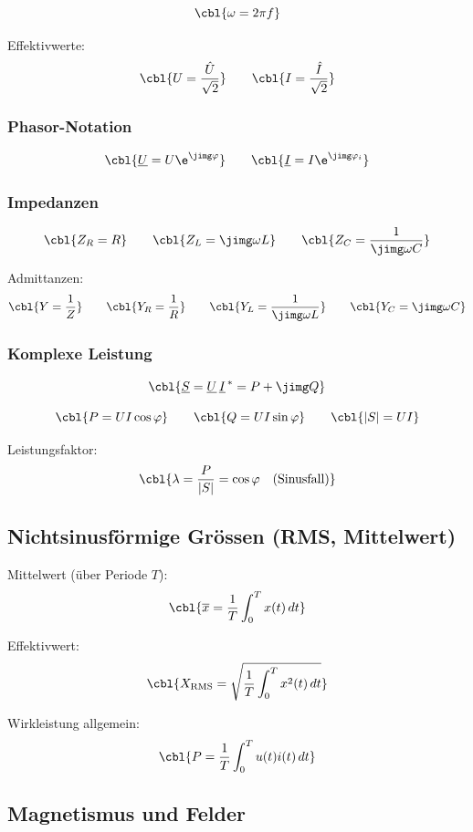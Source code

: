 \[
\cbl{\omega = 2\pi f}
\]

Effektivwerte:
\[
\cbl{U = \frac{\hat U}{\sqrt{2}}}
\qquad
\cbl{I = \frac{\hat I}{\sqrt{2}}}
\]

\subsubsection{Phasor-Notation}

\[
\cbl{\underline{U} = U \e^{\jimg \varphi}}
\qquad
\cbl{\underline{I} = I \e^{\jimg \varphi_i}}
\]

\subsubsection{Impedanzen}

\[
\cbl{Z_R = R}
\qquad
\cbl{Z_L = \jimg \omega L}
\qquad
\cbl{Z_C = \frac{1}{\jimg \omega C}}
\]

Admittanzen:
\[
\cbl{Y = \frac{1}{Z}}
\qquad
\cbl{Y_R = \frac{1}{R}}
\qquad
\cbl{Y_L = \frac{1}{\jimg \omega L}}
\qquad
\cbl{Y_C = \jimg \omega C}
\]

\subsubsection{Komplexe Leistung}

\[
\cbl{\underline{S} = \underline{U}\, \underline{I}^{\,\ast} = P + \jimg Q}
\]

\[
\cbl{P = U I \cos\varphi}
\qquad
\cbl{Q = U I \sin\varphi}
\qquad
\cbl{|S| = U I}
\]

Leistungsfaktor:
\[
\cbl{\lambda = \frac{P}{|S|} = \cos\varphi \quad \text{(Sinusfall)}}
\]

\subsection{Nichtsinusförmige Grössen (RMS, Mittelwert)}

Mittelwert (über Periode $T$):
\[
\cbl{\overline{x} = \frac{1}{T}\int_0^T x(t)\,dt}
\]

Effektivwert:
\[
\cbl{X_{\mathrm{RMS}} = \sqrt{\frac{1}{T}\int_0^T x^2(t)\,dt}}
\]

Wirkleistung allgemein:
\[
\cbl{P = \frac{1}{T}\int_0^T u(t)i(t)\,dt}
\]

\subsection{Magnetismus und Felder}

